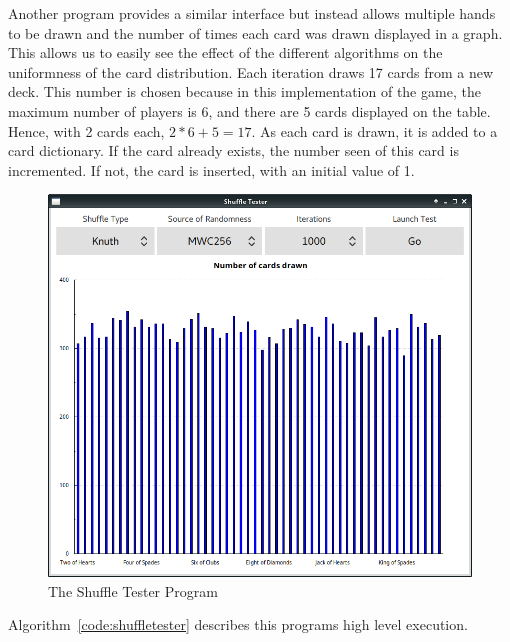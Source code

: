 Another program provides a similar interface but instead allows multiple hands 
to be drawn and the number of times each card was drawn displayed in a graph. 
This allows us to easily see the effect of the different algorithms on the 
uniformness of the card distribution. Each iteration draws 17 cards from
a new deck. This number is chosen because in this implementation of the game,
the maximum number of players is 6, and there are 5 cards displayed on the
table. Hence, with 2 cards each, $2 * 6 + 5 = 17$. As each card is drawn,
it is added to a card dictionary. If the card already exists, the number seen
of this card is incremented. If not, the card is inserted, with an initial
value of 1. 

\begin{figure}[H]
    \centering
    \includegraphics[width=0.8\linewidth]{../images/shuffletester.png}
    \caption{The Shuffle Tester Program}%
    \label{fig:shuffletester}
\end{figure}

Algorithm~\ref{code:shuffletester} describes this programs high
level execution.

\vspace{0.3cm}

